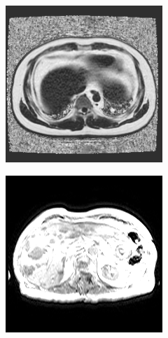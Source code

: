 \begin{figure}
\begin{subfigure}[b]{0.25\textwidth}
                \includegraphics[width=.95\linewidth]{img_hyperopt/abdo_2}
        \end{subfigure}%
        \begin{subfigure}[b]{0.25\textwidth}
                \centering
                \includegraphics[width=.95\linewidth]{img_hyperopt/abdo_3}

\end{subfigure}
\end{figure}
